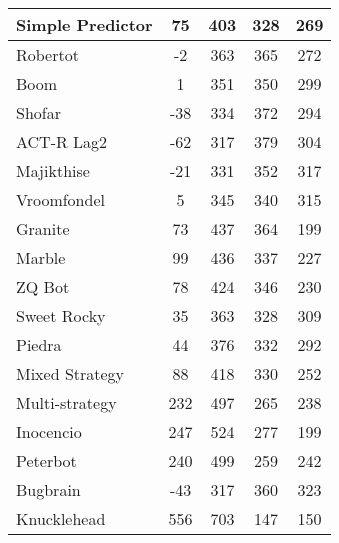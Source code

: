 \begin{table*}
\begin{tabular}{|l|c|c|c|c|}
Simple Predictor & 75 & 403 & 328 & 269 \\ \hline 
Robertot & -2 & 363 & 365 & 272 \\ \hline 
Boom & 1 & 351 & 350 & 299 \\ \hline 
Shofar & -38 & 334 & 372 & 294 \\ \hline 
ACT-R Lag2 & -62 & 317 & 379 & 304 \\ \hline 
Majikthise & -21 & 331 & 352 & 317 \\ \hline 
Vroomfondel & 5 & 345 & 340 & 315 \\ \hline 
Granite & 73 & 437 & 364 & 199 \\ \hline 
Marble & 99 & 436 & 337 & 227 \\ \hline 
ZQ Bot & 78 & 424 & 346 & 230 \\ \hline 
Sweet Rocky & 35 & 363 & 328 & 309 \\ \hline 
Piedra & 44 & 376 & 332 & 292 \\ \hline 
Mixed Strategy & 88 & 418 & 330 & 252 \\ \hline 
Multi-strategy & 232 & 497 & 265 & 238 \\ \hline 
Inocencio & 247 & 524 & 277 & 199 \\ \hline 
Peterbot & 240 & 499 & 259 & 242 \\ \hline 
Bugbrain & -43 & 317 & 360 & 323 \\ \hline 
Knucklehead & 556 & 703 & 147 & 150 \\ \hline
        \end{tabular}
    \end{table*}